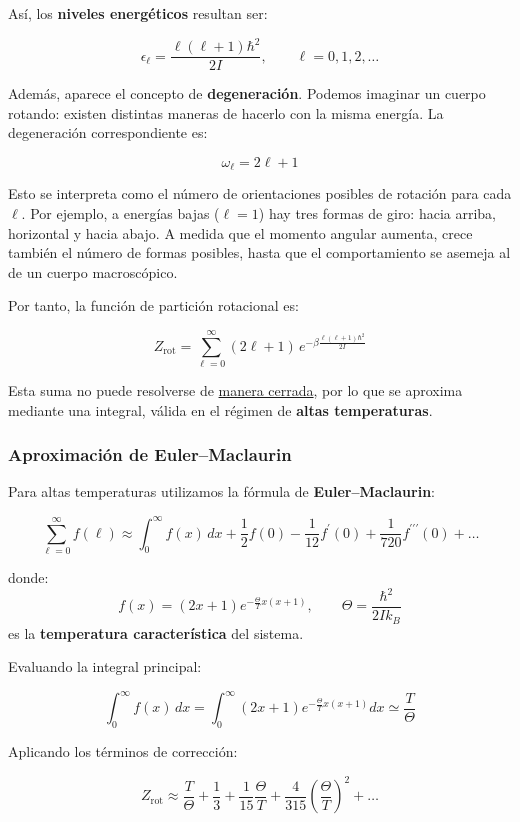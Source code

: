 \documentclass{article}
\begin{document}
Así, los \textbf{niveles energéticos} resultan ser:

\[
\epsilon_{\ell} = \frac{\ell (\ell +1)\hbar^{2}}{2I}, 
\qquad \ell = 0,1,2,\ldots
\]

Además, aparece el concepto de \textbf{degeneración}.  
Podemos imaginar un cuerpo rotando: existen distintas maneras de hacerlo con la misma energía.  
La degeneración correspondiente es:

\[
\omega_{\ell} = 2\ell +1
\]

Esto se interpreta como el número de orientaciones posibles de rotación para cada $\ell$.  
Por ejemplo, a energías bajas ($\ell=1$) hay tres formas de giro: hacia arriba, horizontal y hacia abajo.  
A medida que el momento angular aumenta, crece también el número de formas posibles, hasta que el comportamiento se asemeja al de un cuerpo macroscópico.

Por tanto, la función de partición rotacional es:

\[
Z_{\text{rot}} = \sum\limits_{\ell=0}^{\infty} (2\ell +1)\,
e^{ -\beta \frac{\ell (\ell +1)\hbar^{2} }{2I} }
\]

Esta suma no puede resolverse de \underline{manera cerrada}, por lo que se aproxima mediante una integral, válida en el régimen de \textbf{altas temperaturas}.


\subsubsection*{Aproximación de Euler--Maclaurin}

Para altas temperaturas utilizamos la fórmula de \textbf{Euler--Maclaurin}:

\[
\sum\limits_{\ell =0}^{\infty} f(\ell) \approx
\int_{0}^{\infty} f(x)\,dx + \frac{1}{2}f(0)
- \frac{1}{12} f^{\prime}(0) + \frac{1}{720} f^{\prime\prime\prime}(0) + \ldots
\]

donde:
\[
f(x) = (2x+1)e^{ -\frac{\Theta}{T}x(x+1) },
\qquad
\Theta = \frac{\hbar^{2}}{2I k_{B}}
\]
es la \textbf{temperatura característica} del sistema.

Evaluando la integral principal:

\[
\int_{0}^{\infty} f(x)\,dx
= \int_{0}^{\infty} (2x+1)e^{- \frac{\Theta}{T} x(x+1) } dx
\simeq \frac{T}{\Theta}
\]

Aplicando los términos de corrección:

\[
Z_{\text{rot}} \approx 
\frac{T}{\Theta} + \frac{1}{3} + \frac{1}{15}\frac{\Theta}{T}
+ \frac{4}{315}\left( \frac{\Theta}{T} \right)^{2} + \ldots
\]
\end{document}
